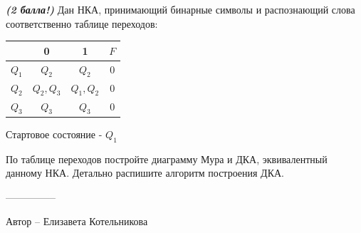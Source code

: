 \question
\textbf{\textit{(2 балла!)}} Дан НКА, принимающий бинарные символы и распознающий слова соответственно таблице переходов:

\begin{tabular}{||c | c c c||} 
 \hline
 & 0 & 1 & $F$ \\ 
 \hline\hline
 $Q_1$ & $Q_2$ & $Q_2$ & 0 \\ 
 \hline
 $Q_2$ &  $Q_2, Q_3$ & $Q_1, Q_2$ & 0 \\
 \hline
 $Q_3$ &  $Q_3$ & $Q_3$ & 0 \\
 \hline
\end{tabular}

Стартовое состояние - $Q_1$

По таблице переходов постройте диаграмму Мура и ДКА, эквивалентный данному НКА. Детально распишите алгоритм построения ДКА.

---------------

Автор -- Елизавета Котельникова
